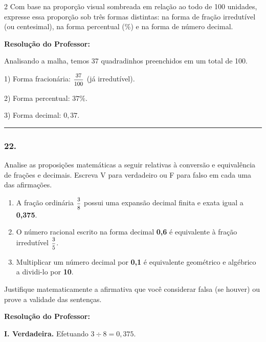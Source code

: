 \begin{multicols*}{2}
Com base na proporção visual sombreada em relação ao todo de 100 unidades, expresse essa proporção sob três formas distintas: na forma de fração irredutível (ou centesimal), na forma percentual (\%) e na forma de número decimal.

\ifgabarito
    \begin{tcolorbox}[colback=CorTitUm!5, colframe=CorTitUm, boxrule=1pt, arc=4pt, left=6pt, right=6pt, top=6pt, bottom=6pt]
    \small\textbf{\textcolor{CorTitUm}{Resolução do Professor:}}\par\vspace{0.1cm}
    \color{CinzaEscuro}
    Analisando a malha, temos 37 quadradinhos preenchidos em um total de 100.
    
    1) Forma fracionária: $\mfrac{37}{100}$ (já irredutível).
    
    2) Forma percentual: $37\%$.
    
    3) Forma decimal: $0,37$.
    \end{tcolorbox}
\fi
\par\vspace{\espacoQuestao}

\noindent\textcolor{CorLinha}{\rule{\linewidth}{0.5pt}} 
\par\vspace{\espacoPreQuestao}
\subsubsection*{22.} Analise as proposições matemáticas a seguir relativas à conversão e equivalência de frações e decimais. Escreva V para verdadeiro ou F para falso em cada uma das afirmações.
\begin{enumerate}[label=\Roman*., itemsep=\espacoAlt]
    \item A fração ordinária $\mfrac{3}{8}$ possui uma expansão decimal finita e exata igual a \textbf{0,375}.
    \item O número racional escrito na forma decimal \textbf{0,6} é equivalente à fração irredutível $\mfrac{3}{5}$.
    \item Multiplicar um número decimal por \textbf{0,1} é equivalente geométrico e algébrico a dividi-lo por \textbf{10}.
\end{enumerate}
Justifique matematicamente a afirmativa que você considerar falsa (se houver) ou prove a validade das sentenças.

\ifgabarito
    \begin{tcolorbox}[colback=CorTitUm!5, colframe=CorTitUm, boxrule=1pt, arc=4pt, left=6pt, right=6pt, top=6pt, bottom=6pt]
    \small\textbf{\textcolor{CorTitUm}{Resolução do Professor:}}\par\vspace{0.1cm}
    \color{CinzaEscuro}
    \textbf{I. Verdadeira.} Efetuando $3 \div 8 = 0,375$.
    

\end{tcolorbox}
\end{multicols*}
